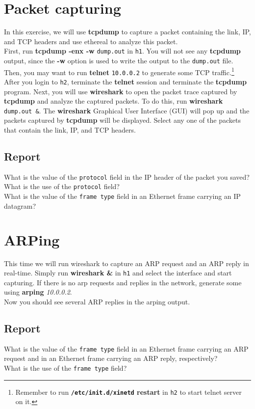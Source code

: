 \documentclass[10pt,a4paper]{article}
\numberwithin{equation}{section}
\numberwithin{figure}{section}
\numberwithin{table}{section}
\begin{document}
    \section{Packet capturing}
    In this exercise, we will use \textbf{tcpdump} to capture a packet containing the link, IP, and TCP headers and use ethereal to analyze this packet. \\
    First, run \textbf{tcpdump -enx -w} \texttt{dump.out} in \texttt{h1}.
    You will not see any \textbf{tcpdump} output, since the \textbf{-w} option is used to write the output to the \texttt{dump.out} file. \\
    Then, you may want to run \textbf{telnet} \texttt{10.0.0.2} to generate some TCP traffic.\footnote{Remember to run \textbf{\texttt{/etc/init.d/xinetd} restart} in \texttt{h2} to start telnet server on it.}
    After you login to \texttt{h2}, terminate the \textbf{telnet} session and terminate the \textbf{tcpdump} program.
    Next, you will use \textbf{wireshark} to open the packet trace captured by \textbf{tcpdump} and analyze the captured packets.
    To do this, run \textbf{wireshark} \texttt{dump.out \&}.
    The \textbf{wireshark} Graphical User Interface (GUI) will pop up and the packets captured by \textbf{tcpdump} will be displayed.
    Select any one of the packets that contain the link, IP, and TCP headers.
    \subsection*{Report}
    What is the value of the \texttt{protocol} field in the IP header of the packet you saved?
    What is the use of the \texttt{protocol} field? \\
    What is the value of the \texttt{frame type} field in an Ethernet frame carrying an IP datagram?


    \section{ARPing}
    This time we will run wireshark to capture an ARP request and an ARP reply in real-time. Simply run \textbf{wireshark \&} in \texttt{h1} and select the interface and start capturing.
    If there is no arp requests and replies in the network, generate some using \textbf{arping} \textit{10.0.0.2}. \\
    Now you should see several ARP replies in the arping output.
    \subsection*{Report}
    What is the value of the \texttt{frame type} field in an Ethernet frame carrying an ARP request and in an Ethernet frame carrying an ARP reply, respectively? \\
    What is the use of the \texttt{frame type} field? \\
\end{document}
